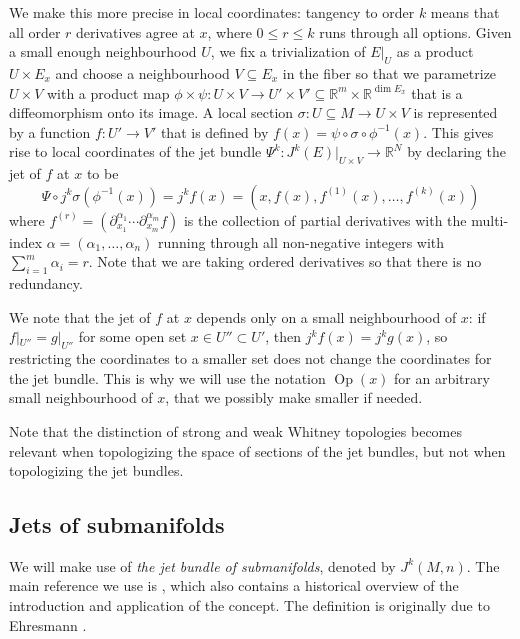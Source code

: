 \documentclass{amsart}
\newcommand{\RR}{\mathbb{R}}
\newcommand{\Op}{\operatorname{Op}}
\theoremstyle{definition}
\theoremstyle{remark}
\numberwithin{equation}{section}
\begin{document}
We make this more precise in local coordinates: tangency to order $k$ means that all order $r$ derivatives agree at $x$, where $0\leq r\leq k$ runs through all options. Given a small enough neighbourhood $U$, we fix a trivialization of $E|_U$ as a product $U\times E_x$ and choose a neighbourhood $V\subseteq E_x$ in the fiber so that we parametrize $U\times V$ with a product map $\phi\times\psi:U\times V\to U'\times V'\subseteq \RR^m\times\RR^{\dim E_x}$ that is a diffeomorphism onto its image. A local section $\sigma:U\subseteq M\to U\times V$ is represented by a function $f:U'\to V'$ that is defined by $f(x)=\psi\circ\sigma\circ\phi^{-1}(x)$. This gives rise to local coordinates of the jet bundle $\Psi^k:J^k(E)|_{U\times V}\to \RR^N$ by declaring the jet of $f$ at $x$ to be 
$$\Psi\circ j^k\sigma(\phi^{-1}(x))=j^kf(x)=\left(x,f(x),f^{(1)}(x),\ldots,f^{(k)}(x)\right)$$
where $f^{(r)}=(\partial^{\alpha_1}_{x_1}\cdots\partial^{\alpha_m}_{x_m} f)$ is the collection of partial derivatives with the multi-index $\alpha=(\alpha_1,\ldots,\alpha_n)$ running through all non-negative integers with $\sum_{i=1}^m\alpha_i=r$. Note that we are taking ordered derivatives so that there is no redundancy.

We note that the jet of $f$ at $x$ depends only on a small neighbourhood of $x$: if $f|_{U''}=g|_{U''}$ for some open set $x\in U''\subset U'$, then $j^kf(x)=j^kg(x)$, so restricting the coordinates to a smaller set does not change the coordinates for the jet bundle. This is why we will use the notation $\Op(x)$ for an arbitrary small neighbourhood of $x$, that we possibly make smaller if needed. 

Note that the distinction of strong and weak Whitney topologies becomes relevant when topologizing the space of sections of the jet bundles, but not when topologizing the jet bundles. 




\subsection{Jets of submanifolds}
We will make use of \emph{the jet bundle of submanifolds}, denoted by $J^k(M,n)$. The main reference we use is \cite{Ma03}, which also contains a historical overview of the introduction and application of the concept. The definition is originally due to Ehresmann \cite{Eh52}. 
\end{document}

